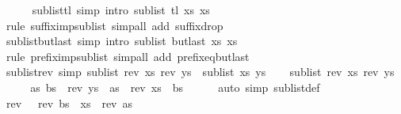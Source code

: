 \begin{isabellebody}
{\isafoldproof}%
%
\isadelimproof
\isanewline
%
\endisadelimproof
\ \ \ \ \isanewline
{}\isamarkupfalse%
\ sublist{\isacharunderscore}tl\ {\isacharbrackleft}simp{\isacharcomma}\ intro{\isacharbrackright}{\isacharcolon}\ {\isachardoublequoteopen}sublist\ {\isacharparenleft}tl\ xs{\isacharparenright}\ xs{\isachardoublequoteclose}\isanewline
%
\isadelimproof
\ \ %
\endisadelimproof
%
\isatagproof
{}\isamarkupfalse%
\ {\isacharparenleft}rule\ suffix{\isacharunderscore}imp{\isacharunderscore}sublist{\isacharparenright}\ {\isacharparenleft}simp{\isacharunderscore}all\ add{\isacharcolon}\ suffix{\isacharunderscore}drop{\isacharparenright}%
\endisatagproof
{\isafoldproof}%
%
\isadelimproof
\isanewline
%
\endisadelimproof
\ \ \ \ \isanewline
{}\isamarkupfalse%
\ sublist{\isacharunderscore}butlast\ {\isacharbrackleft}simp{\isacharcomma}\ intro{\isacharbrackright}{\isacharcolon}\ {\isachardoublequoteopen}sublist\ {\isacharparenleft}butlast\ xs{\isacharparenright}\ xs{\isachardoublequoteclose}\isanewline
%
\isadelimproof
\ \ %
\endisadelimproof
%
\isatagproof
{}\isamarkupfalse%
\ {\isacharparenleft}rule\ prefix{\isacharunderscore}imp{\isacharunderscore}sublist{\isacharparenright}\ {\isacharparenleft}simp{\isacharunderscore}all\ add{\isacharcolon}\ prefixeq{\isacharunderscore}butlast{\isacharparenright}%
\endisatagproof
{\isafoldproof}%
%
\isadelimproof
\isanewline
%
\endisadelimproof
\ \ \ \ \isanewline
{}\isamarkupfalse%
\ sublist{\isacharunderscore}rev\ {\isacharbrackleft}simp{\isacharbrackright}{\isacharcolon}\ {\isachardoublequoteopen}sublist\ {\isacharparenleft}rev\ xs{\isacharparenright}\ {\isacharparenleft}rev\ ys{\isacharparenright}\ {\isacharequal}\ sublist\ xs\ ys{\isachardoublequoteclose}\isanewline
%
\isadelimproof
%
\endisadelimproof
%
\isatagproof
{}\isamarkupfalse%
\isanewline
\ \ \isamarkupfalse%
\ {\isachardoublequoteopen}sublist\ {\isacharparenleft}rev\ xs{\isacharparenright}\ {\isacharparenleft}rev\ ys{\isacharparenright}{\isachardoublequoteclose}\isanewline
\ \ \isamarkupfalse%
\ \isamarkupfalse%
\ as\ bs\ \ {\isachardoublequoteopen}rev\ ys\ {\isacharequal}\ as\ {\isacharat}\ rev\ xs\ {\isacharat}\ bs{\isachardoublequoteclose}\isanewline
\ \ \ \ \isamarkupfalse%
\ {\isacharparenleft}auto\ simp{\isacharcolon}\ sublist{\isacharunderscore}def{\isacharparenright}\isanewline
\ \ \isamarkupfalse%
\ \isamarkupfalse%
\ {\isachardoublequoteopen}rev\ {\isasymdots}\ {\isacharequal}\ rev\ bs\ {\isacharat}\ xs\ {\isacharat}\ rev\ as{\isachardoublequoteclose}\ \isamarkupfalse%

\end{isabellebody}

